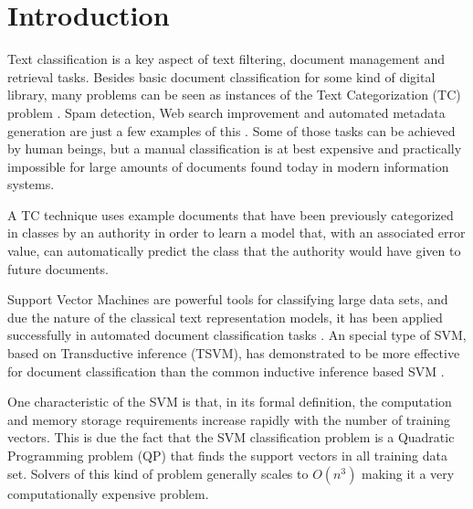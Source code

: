 \section{Introduction}

Text classification is a key aspect of text filtering, document management
and retrieval tasks. Besides basic document classification for some
kind of digital library, many problems can be seen as instances of
the Text Categorization (TC) problem . Spam detection, Web search
improvement and automated metadata generation are just a few examples
of this \cite{Sebastiani02}.  Some of those tasks can be achieved
by human beings, but a manual classification is at best expensive
and practically impossible for large amounts of documents found today
in modern information systems.

A TC technique uses example documents that have been previously categorized
in classes by an authority in order to learn a model that, with an
associated error value, can automatically predict the class that the
authority would have given to future documents. 

Support Vector Machines \cite{Vapnik98} are powerful tools for classifying
large data sets, and due the nature of the classical text representation
models, it has been applied successfully in automated document classification
tasks \cite{Joachims98,Joachims99c}. An special type of SVM, based
on Transductive inference (TSVM), has demonstrated to be more effective
for document classification than the common inductive inference based
SVM \cite{Joachims99c}.

One characteristic of the SVM is that, in its formal definition, the
computation and memory storage requirements increase rapidly with
the number of training vectors. This is due the fact that the SVM
classification problem is a Quadratic Programming problem (QP) that
finds the support vectors in all training data set. Solvers of this
kind of problem generally scales to $O(n^{3})$ making it a very computationally
expensive problem.


